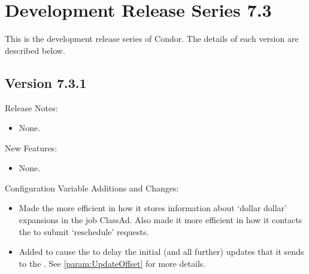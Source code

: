
\section{\label{sec:History-7-3}Development Release Series 7.3}

This is the development release series of Condor.
The details of each version are described below.

\subsection*{\label{sec:New-7-3-1}Version 7.3.1}

\noindent Release Notes:

\begin{itemize}

\item None.

\end{itemize}


\noindent New Features:

\begin{itemize}

\item None.

\end{itemize}

\noindent Configuration Variable Additions and Changes:

\begin{itemize}

\item Made the  more efficient in how it stores
information about `dollar dollar' expansions in the job ClassAd.
Also made it more efficient in how it contacts the 
to submit `reschedule' requests.

\item Added  to cause the  to
  delay the initial (and all further) updates that it sends to the
  .  See \ref{param:UpdateOffset} for more details.

\end{itemize}

